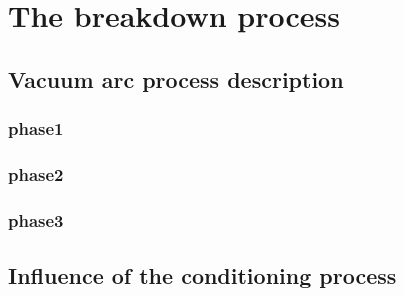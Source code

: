 \chapter[The breakdown process]{The breakdown process}

\section[Vacuum arc process description]{Vacuum arc process description}

\subsection[phase1]{phase1}

\subsection[phase2]{phase2}

\subsection[phase3]{phase3}

\section[Influence of the conditioning process]{Influence of the conditioning process}
